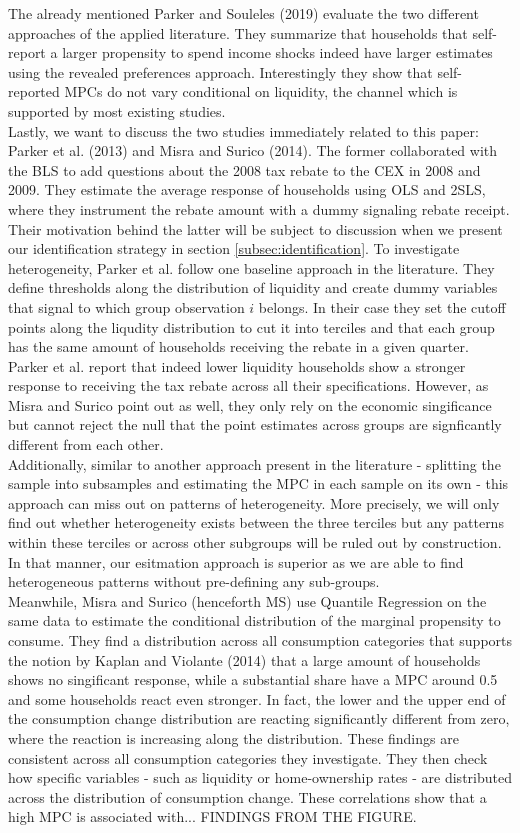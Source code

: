 The already mentioned Parker and Souleles (2019) evaluate the two different approaches of the applied literature. They summarize that households that self-report a larger propensity to spend income shocks indeed have larger estimates using the revealed preferences approach. Interestingly they show that self-reported MPCs do not vary conditional on liquidity, the channel which is supported by most existing studies. 
\\
Lastly, we want to discuss the two studies immediately related to this paper: Parker et al. (2013) and Misra and Surico (2014). The former collaborated with the BLS to add questions about the 2008 tax rebate to the CEX in 2008 and 2009. They estimate the average response of households using OLS and 2SLS, where they instrument the rebate amount with a dummy signaling rebate receipt. Their motivation behind the latter will be subject to discussion when we present our identification strategy in section \ref{subsec:identification}. To investigate heterogeneity, Parker et al. follow one baseline approach in the literature. They define thresholds along the distribution of liquidity and create dummy variables that signal to which group observation $i$ belongs. In their case they set the cutoff points along the liqudity distribution to cut it into terciles and that each group has the same amount of households receiving the rebate in a given quarter. Parker et al. report that indeed lower liquidity households show a stronger response to receiving the tax rebate across all their specifications. However, as Misra and Surico point out as well, they only rely on the economic singificance but cannot reject the null that the point estimates across groups are signficantly different from each other. \\
Additionally, similar to another approach present in the literature - splitting the sample into subsamples and estimating the MPC in each sample on its own - this approach can miss out on patterns of heterogeneity. More precisely, we will only find out whether heterogeneity exists between the three terciles but any patterns within these terciles or across other subgroups will be ruled out by construction. In that manner, our esitmation approach is superior as we are able to find heterogeneous patterns without pre-defining any sub-groups. \\
Meanwhile, Misra and Surico (henceforth MS) use Quantile Regression on the same data to estimate the conditional distribution of the marginal propensity to consume. They find a distribution across all consumption categories that supports the notion by Kaplan and Violante (2014) that a large amount of households shows no singificant response, while a substantial share have a MPC around 0.5 and some households react even stronger. In fact, the lower and the upper end of the consumption change distribution are reacting significantly different from zero, where the reaction is increasing along the distribution. These findings are consistent across all consumption categories they investigate. They then check how specific variables - such as liquidity or home-ownership rates - are distributed across the distribution of consumption change. These correlations show that a high MPC is associated with... FINDINGS FROM THE FIGURE. \\ 
